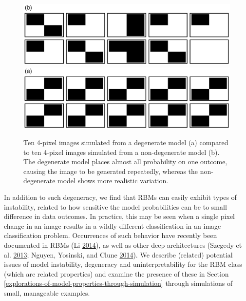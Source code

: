 \documentclass[]{article}
\theoremstyle{definition}
\begin{document}
\par
\begin{figure}
\includegraphics[width=1\linewidth]{paper_files/figure-latex/sample-models-1} \includegraphics[width=1\linewidth]{paper_files/figure-latex/sample-models-2} \caption{Ten 4-pixel images simulated from a degenerate model (a) compared to ten 4-pixel images simulated from a non-degenerate model (b). The degenerate model places almost all probability on one outcome, causing the image to be generated repeatedly, whereas the non-degenerate model shows more realistic variation.}\label{fig:sample-models}
\end{figure}
In addition to such degeneracy, we find that RBMs can easily exhibit
types of instability, related to how sensitive the model probabilities
can be to small difference in data outcomes. In practice, this may be
seen when a single pixel change in an image results in a wildly
different classification in an image classification problem. Occurrences
of such behavior have recently been documented in RBMs (Li
\protect\hyperlink{ref-li2014biclustering}{2014}), as well as other deep
architectures (Szegedy et al.
\protect\hyperlink{ref-szegedy2013intriguing}{2013}; Nguyen, Yosinski,
and Clune \protect\hyperlink{ref-nguyen2014deep}{2014}). We describe
(related) potential issues of model instability, degeneracy and
uninterpretability for the RBM class (which are related properties) and
examine the presence of these in Section
\ref{explorations-of-model-properties-through-simulation} through
simulations of small, manageable examples.
\end{document}
